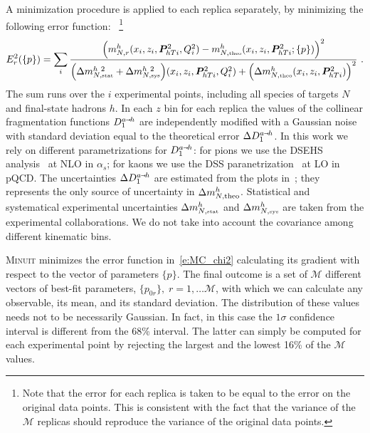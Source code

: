 \documentclass[aps,preprintnumbers,showpacs,nofootinbib,superscriptaddress,floatfix]{revtex4}
\newcommand{\smarrow}{\mbox{\raisebox{-4.5pt}[0pt][0pt]{$\hspace{-1pt} 
		\vec{\phantom{v}}$}}}
\newcommand{\minuit}{\textsc{Minuit }}
\newcommand{\Tperp}{T}
\begin{document}
A minimization procedure is applied to each replica separately, by minimizing the following error function:
~\footnote{Note that the error for each replica is taken to be equal to the error on the original data points. This is consistent with the fact that the variance of the $\mathcal{M}$ replicas should reproduce the variance of the original data points.}  
\begin{equation}
E_r^2(\{p\})=\sum_{i} 
\frac{\Bigl(m_{N, r}^{h}(x_i, z_i, \bm{P}_{h\Tperp i}^2, Q_i^2) - m_{N,  \mbox{\tiny theo}}^{h}(x_i, z_i, \bm{P}_{h\Tperp i}^2; \{p\})\Bigr)^2}
        {\Bigl( \Delta m_{N, \mbox{\tiny stat}}^{h\ 2} + \Delta m_{N, \mbox{\tiny sys}}^{h\ 2} \Bigr)(x_i, z_i, \bm{P}_{h\Tperp i}^2, Q^2_i) +\Bigl(\Delta m_{N, \mbox{\tiny theo}}^{h}(x_i, z_i, \bm{P}_{h\Tperp i}^2) \Bigr)^2}\  . 
\label{e:MC_chi2}
\end{equation}
The sum runs over the $i$ experimental points, including all species of targets $N$ and final-state hadrons $h$. 
In each $z$ bin for each replica the values of the collinear fragmentation functions $D_1^{a \smarrow h}$ are independently modified with a Gaussian noise with standard deviation equal to the theoretical error $\Delta D_1^{a\smarrow h}$. 
In this work we rely on different parametrizations for $D_1^{a \smarrow h}$: for pions we use the DSEHS analysis~\cite{deFlorian:2014xna} at NLO in $\alpha_s$; for kaons we use the DSS paranetrization~\cite{deFlorian:2007aj} at LO in pQCD. 
The uncertainties $\Delta D_1^{a\smarrow h}$ are estimated from the plots in~\cite{Epele:2012vg}; they represents the only source of uncertainty in $\Delta m_{N,  {\rm theo}}^{h}$. 
Statistical and systematical experimental uncertainties $\Delta m_{N, \mbox{\tiny stat}}^{h}$ and $\Delta m_{N, \mbox{\tiny sys}}^{h}$ are taken from the experimental collaborations. 
We do not take into account the covariance among different kinematic bins. 

\minuit minimizes the error function in~\eqref{e:MC_chi2} calculating its gradient with respect to the vector of parameters $\{p\}$. 
The final outcome is a set of $\mathcal{M}$ different vectors of best-fit parameters, $\{ p_{0r}\},\; r=1,\ldots \mathcal{M}$, with which we can calculate any observable, its mean, and its standard deviation. 
The distribution of these values needs not to be necessarily Gaussian. In fact, in this case the $1 \sigma$ confidence interval is different from the 68\% interval. 
The latter can simply be computed for each experimental point by rejecting the largest and the lowest 16\% of the $\mathcal{M}$ values.   
\end{document}
